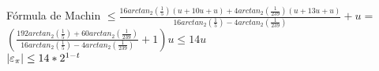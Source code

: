 \begin{subsection}{Fórmula de Machin}
	$\leq \frac{16arctan_2(\frac{1}{5})(u + 10u + u) + 4arctan_2(\frac{1}{239})(u + 13u + u)}{16arctan_2(\frac{1}{5})-4arctan_2(\frac{1}{239})} + u =$\\
	
	$(\frac{192arctan_2(\frac{1}{5}) + 60arctan_2(\frac{1}{239})}{16arctan_2(\frac{1}{5})-4arctan_2(\frac{1}{239})} + 1) u \leq 14u$\\
	
	$\left|\varepsilon _{\pi}\right| \leq 14*2^{1-t}$
	
	
\end{subsection}
